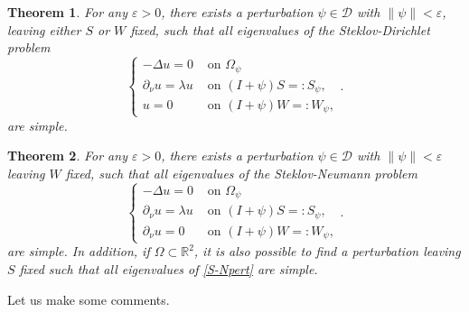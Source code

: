 \documentclass[a4paper,reqno,11pt,oneside]{amsart}
\theoremstyle{plain}
\newtheorem{thm}{Theorem}
\theoremstyle{plain}
\theoremstyle{plain}
\theoremstyle{remark}
\begin{document}
\begin{thm}\label{th:SD}
For any $\varepsilon > 0$, there exists a perturbation $\psi \in \mathcal{D}$ with $\|\psi\| < \varepsilon$, leaving either $S$ or $W$ fixed, such that all eigenvalues of the Steklov-Dirichlet problem
\begin{equation}\label{S-Dpert}
\left\{
    \begin{array}{cc}
         -\Delta u=0& \text{ on } \Omega_\psi\\
        \partial_\nu u=\lambda u & \text{ on } (I+\psi)S=:S_\psi,\\
      u=0  & \text{ on }  (I+\psi)W=:W_\psi,
    \end{array}.
    \right.
\end{equation}
are simple.
 
\end{thm}

\begin{thm}\label{th:SN}
For any $\varepsilon > 0$, there exists a perturbation $\psi \in \mathcal{D}$ with $\|\psi\| < \varepsilon$ leaving $W$ fixed, such that all eigenvalues of the Steklov-Neumann  problem
\begin{equation}\label{S-Npert}
\left\{
    \begin{array}{cc}
         -\Delta u=0& \text{ on } \Omega_\psi\\
        \partial_\nu u=\lambda u & \text{ on } (I+\psi)S=:S_\psi,\\
    \partial_\nu  u=0  & \text{ on }  (I+\psi)W=:W_\psi,
    \end{array}.
    \right.
\end{equation}
are simple. In addition, if $\Omega \subset \mathbb{R}^2$, it is also possible to find a perturbation leaving $S$ fixed such that all eigenvalues of \eqref{S-Npert} are simple.
\end{thm}

Let us make some comments.
\end{document}
